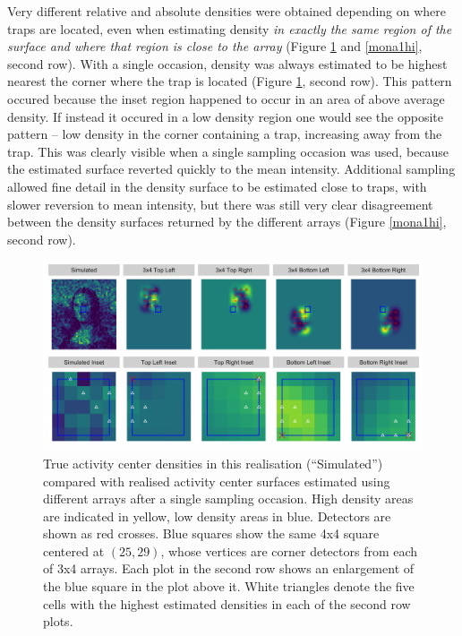 \documentclass[a4paper,12pt]{article}
\begin{document}
Very different relative and absolute densities were obtained depending on where traps are located, even when estimating density {\it in exactly the same region of the surface and where that region is close to the array} (Figure \ref{mona1low} and \ref{mona1hi}, second row). With a single occasion, density was always estimated to be highest nearest the corner where the trap is located (Figure \ref{mona1low}, second row). This pattern occured because the inset region happened to occur in an area of above average density. If instead it occured in a low density region one would see the opposite pattern -- low density in the corner containing a trap, increasing away from the trap. This was clearly visible when a single sampling occasion was used, because the estimated surface reverted quickly to the mean intensity. Additional sampling allowed fine detail in the density surface to be estimated close to traps, with slower reversion to mean intensity, but there was still very clear disagreement between the density surfaces returned by the different arrays (Figure \ref{mona1hi}, second row).

\begin{figure}[htbp]
\centering
\includegraphics[width=1\textwidth]{many_faces_mona_loweffort.png}
\caption{True activity center densities in this realisation (``Simulated'') compared with realised activity center surfaces estimated using different arrays after a single sampling occasion. High density areas are indicated in yellow, low density areas in blue. Detectors are shown as red crosses. Blue squares show the same 4x4 square centered at $(25,29)$, whose vertices are corner detectors from each of 3x4 arrays. Each plot in the second row shows an enlargement of the blue square in the plot above it. White triangles denote the five cells with the highest estimated densities in each of the second row plots.}
\label{mona1low}
\end{figure}
\end{document}

